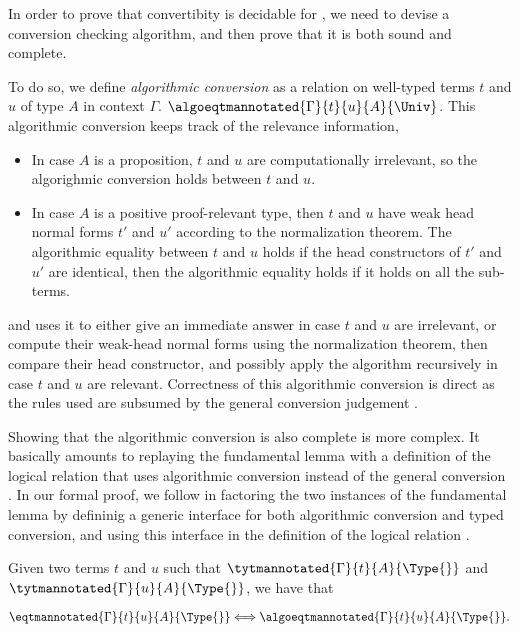 In order to prove that convertibity is decidable for \SetoidCC, we need to 
devise a conversion checking algorithm, and then prove that it is both
sound and complete.

To do so, we define \emph{algorithmic conversion} as a relation on well-typed 
terms \( t \) and \( u \) of type \( A \) in context \( \Gamma \).
$\algoeqtmannotated{\Gamma}{t}{u}{A}{\Univ}$.
%
This algorithmic conversion keeps track of the relevance information,
\begin{itemize}
  \item In case \( A \) is a proposition, \( t \) and \( u \) are 
    computationally irrelevant, so the algorighmic conversion holds
    between \( t \) and \( u \).
  \item In case \( A \) is a positive proof-relevant type, then \( t \) and
    \( u \) have weak head normal forms \( t' \) and \( u' \) according to 
    the normalization theorem. 
    The algorithmic equality between \( t \) and \( u \) holds
    if the head constructors of \( t' \) and \( u' \) are identical, then the 
    algorithmic equality holds if it holds on all the sub-terms.
\end{itemize}
and uses it to either give an immediate answer in case \( t \) and
\( u \) are irrelevant, or compute their weak-head normal forms using
the normalization theorem, then compare their head constructor, and possibly apply the algorithm
recursively in case \( t \) and \( u \) are relevant.
%
Correctness of this algorithmic conversion is direct as the rules used are
subsumed by the general conversion judgement .

Showing that the algorithmic conversion is also complete is more complex.
%
It basically amounts to replaying the fundamental lemma with a definition of the logical
relation that uses algorithmic conversion instead of the general conversion
.
%
In our formal proof, we follow  in factoring the two
instances of the fundamental lemma by defininig a generic interface for both
algorithmic conversion and typed conversion, and using this interface
in the definition of the logical relation .

\begin{theorem}
  \label{thm:algoconv}
    Given two terms $t$ and $u$ such that
    $\tytmannotated{\Gamma}{t}{A}{\Type{}}$ and
    $\tytmannotated{\Gamma}{u}{A}{\Type{}}$, we have that

    $$ \eqtmannotated{\Gamma}{t}{u}{A}{\Type{}} \Longleftrightarrow\algoeqtmannotated{\Gamma}{t}{u}{A}{\Type{}}.$$
\end{theorem}


